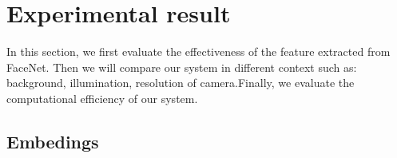 \documentclass[journal, twocolumn]{IEEEtran}
\begin{document}
\medskip
\section{Experimental result}
\label{experimental-result}


In this section, we first evaluate the effectiveness of the feature extracted from FaceNet. Then we will compare our system in different context such as: background, illumination, resolution of camera.Finally, we evaluate the computational efficiency of our system.


\subsection{Embedings} 
\end{document}
